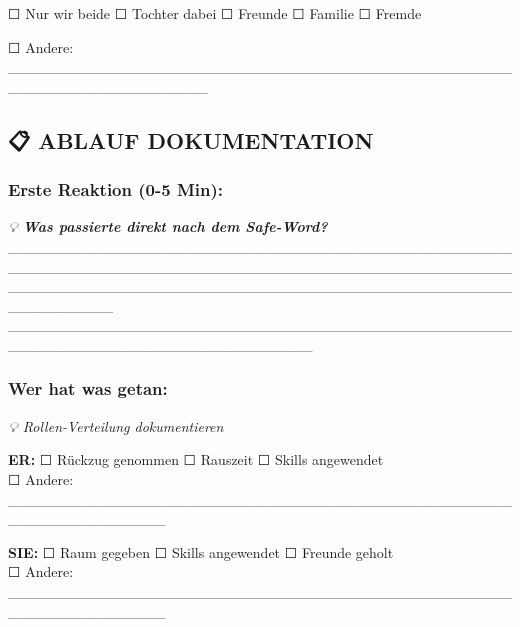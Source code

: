 ☐ Nur wir beide ☐ Tochter dabei ☐ Freunde ☐ Familie ☐ Fremde

☐ Andere: \_\_\_\_\_\_\_\_\_\_\_\_\_\_\_\_\_\_\_\_\_\_\_\_\_\_\_\_\_\_\_\_\_\_\_\_\_\_\_\_\_\_\_\_\_\_\_\_\_\_\_\_\_\_\_\_\_\_\_\_\_\_\_\_\_\_\_

\hypertarget{ablauf-dokumentation-1}{%
\subsection{\texorpdfstring{\textbf{📋 ABLAUF DOKUMENTATION}}{📋 ABLAUF DOKUMENTATION}}\label{ablauf-dokumentation-1}}

\hypertarget{erste-reaktion-0-5-min}{%
\subsubsection{\texorpdfstring{\textbf{Erste Reaktion (0-5 Min):}}{Erste Reaktion (0-5 Min):}}\label{erste-reaktion-0-5-min}}

\emph{💡 \textbf{Was passierte direkt nach dem Safe-Word?}} \_\_\_\_\_\_\_\_\_\_\_\_\_\_\_\_\_\_\_\_\_\_\_\_\_\_\_\_\_\_\_\_\_\_\_\_\_\_\_\_\_\_\_\_\_\_\_\_\_\_\_\_\_\_\_\_\_\_\_\_\_\_\_\_\_\_\_\_\_\_\_\_\_\_\_\_\_\_\_\_\_\_\_\_\_\_\_\_\_\_\_\_\_\_\_\_\_\_\_\_\_\_\_\_\_\_\_\_\_\_\_\_\_\_\_\_\_\_\_\_\_\_\_\_\_\_\_\_\_\_\_\_\_\_\_\_\_\_\_\_\_\_\_\_\_\_\_\_\_\_\_\_\_\_\\
\_\_\_\_\_\_\_\_\_\_\_\_\_\_\_\_\_\_\_\_\_\_\_\_\_\_\_\_\_\_\_\_\_\_\_\_\_\_\_\_\_\_\_\_\_\_\_\_\_\_\_\_\_\_\_\_\_\_\_\_\_\_\_\_\_\_\_\_\_\_\_\_\_\_\_\_\_

\hypertarget{wer-hat-was-getan}{%
\subsubsection{\texorpdfstring{\textbf{Wer hat was getan:}}{Wer hat was getan:}}\label{wer-hat-was-getan}}

\emph{💡 Rollen-Verteilung dokumentieren}

\textbf{ER:} ☐ Rückzug genommen ☐ Rauszeit ☐ Skills angewendet\\
☐ Andere: \_\_\_\_\_\_\_\_\_\_\_\_\_\_\_\_\_\_\_\_\_\_\_\_\_\_\_\_\_\_\_\_\_\_\_\_\_\_\_\_\_\_\_\_\_\_\_\_\_\_\_\_\_\_\_\_\_\_\_\_\_\_\_

\textbf{SIE:} ☐ Raum gegeben ☐ Skills angewendet ☐ Freunde geholt\\
☐ Andere: \_\_\_\_\_\_\_\_\_\_\_\_\_\_\_\_\_\_\_\_\_\_\_\_\_\_\_\_\_\_\_\_\_\_\_\_\_\_\_\_\_\_\_\_\_\_\_\_\_\_\_\_\_\_\_\_\_\_\_\_\_\_\_

